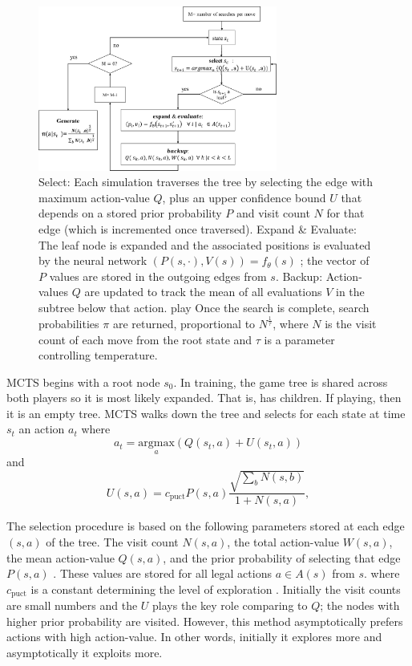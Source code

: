 \documentclass[english]{article}
\begin{document}
\begin{figure}[h]
\centering
\includegraphics[width=0.7\textwidth]{./images/mcts}
\caption{Select: Each simulation traverses the tree by selecting the edge with
maximum action-value $Q$, plus an upper confidence bound $U$ that
depends on a stored prior probability $P$ and visit count $N$ for
that edge (which is incremented once traversed). Expand \& Evaluate:
The leaf node is expanded and the associated positions is evaluated
by the neural network $(P(s,\cdot),V(s))=f_{\theta}(s)$ ; the vector
of $P$ values are stored in the outgoing edges from $s$. Backup: Action-values
$Q$ are updated to track the mean of all evaluations $V$ in the
subtree below that action. play Once the search is complete, search
probabilities $\pi$ are returned, proportional to $N^{\frac{1}{\tau}}$,
where $N$ is the visit count of each move from the root state and
$\tau$ is a parameter controlling temperature.}
\label{fig:figure_mcts}
\end{figure}

MCTS begins with a root node $s_0$. In training, the game tree is shared across
both players so it is most likely expanded. That is, has children. If playing,
then it is an empty tree. MCTS walks down the tree and selects for each state at
time $s_t$ an action $a_t$ where
\begin{equation}
a_t=\underset{a}{\text{argmax}}(Q(s_{t},a)+U(s_{t},a))\label{eq:1}
\end{equation}
and
\begin{equation}
U(s,a)=c_{\text{puct}}P(s,a)\frac{\sqrt{\sum_{b}N(s,b)}}{1+N(s,a)},\label{eq:2}
\end{equation}


The selection procedure is based on the following parameters stored
at each edge $(s,a)$ of the tree. The visit count $N(s,a)$, the
total action-value $W(s,a)$, the mean action-value $Q(s,a)$, and
the prior probability of selecting that edge $P(s,a)$ . These values
are stored for all legal actions $a\in A(s)$ from $s$.  where $c_{\text{puct}}$
is a constant determining the level of exploration \cite{puct}.
Initially the visit counts are small numbers and the $U$ plays the
key role comparing to $Q$; the nodes with higher prior probability
are visited. However, this method asymptotically prefers actions with
high action-value. In other words, initially it explores more and
asymptotically it exploits more. 
\end{document}
